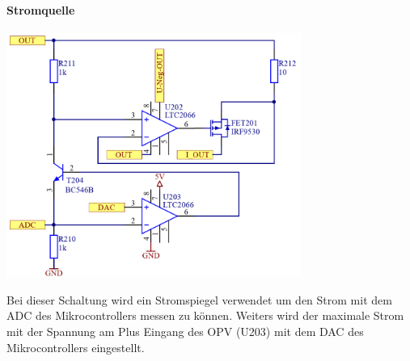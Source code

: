 \documentclass[paper=a4, 12pt]{scrreprt}
\begin{document}
			\paragraph{Stromquelle}
			\begin{adjustbox}{center,caption={Schaltung für die Einstellbare Stromquelle},label={fig:stromquelle},nofloat=figure,vspace=\bigskipamount}
				\includegraphics[height=8cm]{img/Stromquelle_SEPIC.PNG}
			\end{adjustbox}
			Bei dieser Schaltung wird ein Stromspiegel verwendet um den Strom mit dem ADC des Mikrocontrollers messen zu können. Weiters wird der maximale Strom mit der Spannung am Plus Eingang des OPV (U203) mit dem DAC des Mikrocontrollers eingestellt.
			
\end{document}
